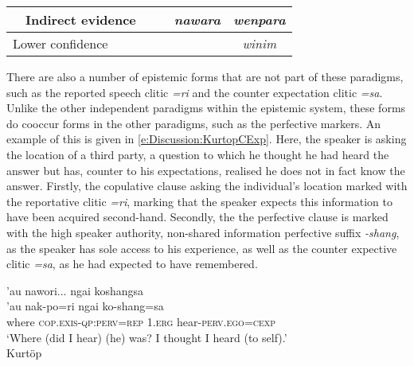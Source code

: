 \begin{table}
{\begin{tabular}{llll|c|c|c|c|}
            \multicolumn{1}{|l|}{}                                 & \multicolumn{3}{l|}{Indirect evidence}                & \cellcolor[HTML]{C0C0C0}                       & \cellcolor[HTML]{C0C0C0} & \textit{nawara}          & \textit{wenpara}                                                                                   \\ \hline
            \multicolumn{4}{|l|}{Lower confidence}                 & \cellcolor[HTML]{C0C0C0}                              & \cellcolor[HTML]{C0C0C0}                       & \cellcolor[HTML]{C0C0C0} & \textit{winim}                                                                                                                \\ \hline
        \end{tabular}}
\end{table}

There are also a number of epistemic forms that are not part of these paradigms, such as the reported speech clitic \textit{=ri} and the counter expectation clitic \textit{=sa}. Unlike the other independent paradigms within the epistemic system, these forms do cooccur forms in the other paradigms, such as the perfective markers. An example of this is given in \ref{e:Discussion:KurtopCExp}. Here, the speaker is asking the location of a third party, a question to which he thought he had heard the answer but has, counter to his expectations, realised he does not in fact know the answer. Firstly, the copulative clause asking the individual's location marked with the reportative clitic \textit{=ri}, marking that the speaker expects this information to have been acquired second-hand. Secondly, the the perfective clause is marked with the high speaker authority, non-shared information perfective suffix \textit{-shang}, as the speaker has sole access to his experience, as well as the counter expective clitic \textit{=sa}, as he had expected to have remembered.

\begin{exe}
    \ex
    \glll 'au nawori... ngai koshangsa \\
    'au nak-po=ri ngai ko-shang=sa \\
    where \textsc{cop.exis-qp:perv=rep} \textsc{1.erg} hear-\textsc{perv.ego=cexp} \\
    \glt `Where (did I hear) (he) was? I thought I heard (to self).' \\
    Kurtöp \cite[East Bodish: Bhutan,][126]{Hyslop2014}

\end{exe}

